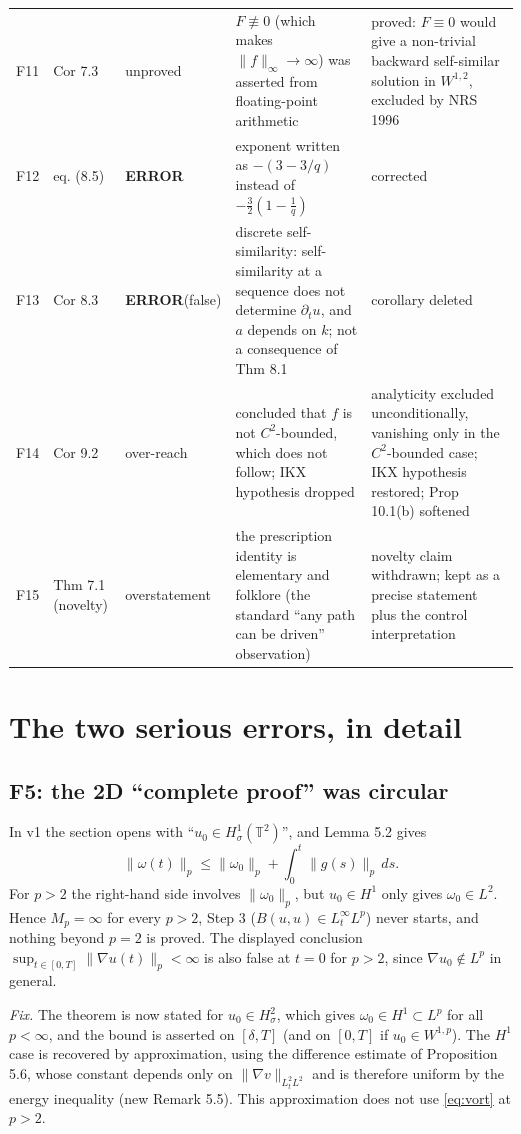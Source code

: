 \documentclass[11pt,a4paper]{article}
\newcommand{\ERR}{\textcolor{err}{\textbf{ERROR}}}
\newcommand{\T}{\mathbb{T}}
\begin{document}
{\begin{longtable}{@{}p{0.45cm}p{2.85cm}p{1.7cm}p{6.5cm}p{5.7cm}@{}}
F11 & Cor 7.3 & unproved & $F\not\equiv0$ (which makes $\|f\|_\infty\to\infty$) was asserted from floating-point arithmetic & proved: $F\equiv0$ would give a non-trivial backward self-similar solution in $W^{1,2}$, excluded by NRS 1996\\
F12 & eq. (8.5) & \ERR & exponent written as $-(3-3/q)$ instead of $-\frac32(1-\frac1q)$ & corrected\\
F13 & Cor 8.3 & \ERR (false) & discrete self-similarity: self-similarity at a sequence does not determine $\partial_tu$, and $a$ depends on $k$; not a consequence of Thm 8.1 & corollary deleted\\
F14 & Cor 9.2 & over-reach & concluded that $f$ is not $C^2$-bounded, which does not follow; IKX hypothesis dropped & analyticity excluded unconditionally, vanishing only in the $C^2$-bounded case; IKX hypothesis restored; Prop 10.1(b) softened\\
F15 & Thm 7.1 (novelty) & overstatement & the prescription identity is elementary and folklore (the standard ``any path can be driven'' observation) & novelty claim withdrawn; kept as a precise statement plus the control interpretation\\
\end{longtable}
}

\section{The two serious errors, in detail}

\subsection{F5: the 2D ``complete proof'' was circular}

In v1 the section opens with ``$u_0\in H^1_\sigma(\T^2)$'', and Lemma 5.2 gives
\begin{equation}\label{eq:vort}
\|\omega(t)\|_p\le\|\omega_0\|_p+\int_0^t\|g(s)\|_p\,ds .
\end{equation}
For $p>2$ the right-hand side involves $\|\omega_0\|_p$, but $u_0\in H^1$ only gives
$\omega_0\in L^2$. Hence $M_p=\infty$ for every $p>2$, Step 3 ($B(u,u)\in L^\infty_tL^p$) never
starts, and nothing beyond $p=2$ is proved. The displayed conclusion
$\sup_{t\in[0,T]}\|\nabla u(t)\|_p<\infty$ is also false at $t=0$ for $p>2$, since
$\nabla u_0\notin L^p$ in general.

\emph{Fix.} The theorem is now stated for $u_0\in H^2_\sigma$, which gives
$\omega_0\in H^1\subset L^p$ for all $p<\infty$, and the bound is asserted on $[\delta,T]$
(and on $[0,T]$ if $u_0\in W^{1,p}$). The $H^1$ case is recovered by approximation, using the
difference estimate of Proposition 5.6, whose constant depends only on
$\|\nabla v\|_{L^2_tL^2}$ and is therefore uniform by the energy inequality (new Remark 5.5).
This approximation does not use \eqref{eq:vort} at $p>2$.
\end{document}

